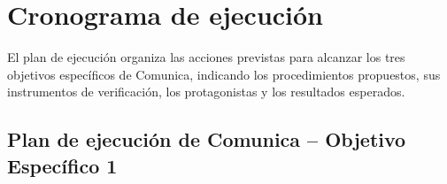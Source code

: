 \renewcommand{\arraystretch}{1.5}

\section{Cronograma de ejecución}
\label{subsec:cronogramaEjecucion}

El plan de ejecución organiza las acciones previstas para alcanzar los tres objetivos específicos de Comunica, indicando los procedimientos propuestos, sus instrumentos de verificación, los protagonistas y los resultados esperados.

\vspace{1.5em}
\subsection{Plan de ejecución de Comunica -- Objetivo Específico 1}


